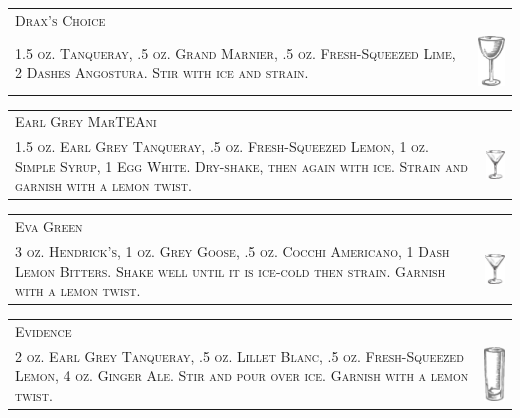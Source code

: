\documentclass{article}
\begin{document}
\begin{tabular}{b{2.5in} m{0.625in}}
  \multicolumn{2}{p{3.5in}}{\centering\Huge\textsc{Drax's Choice}} \\ 
  \textsc{1.5 oz. Tanqueray, .5 oz. Grand Marnier, .5 oz. Fresh-Squeezed Lime,
  2 Dashes Angostura. Stir with ice and strain.} &
  \includegraphics[width=0.5in]{nick_and_nora.png}
\end{tabular}

\begin{tabular}{b{2.5in} m{0.625in}}
  \multicolumn{2}{p{3.5in}}{\centering\Huge\textsc{Earl Grey MarTEAni}} \\ 
  \textsc{1.5 oz. Earl Grey Tanqueray, .5 oz. Fresh-Squeezed Lemon, 
  1 oz. Simple Syrup, 1 Egg White. Dry-shake, then again with ice.
  Strain and garnish with a lemon twist.} &
  \includegraphics[width=0.5in]{goblet.png}
\end{tabular}

\begin{tabular}{b{2.5in} m{0.625in}}
  \multicolumn{2}{p{3.5in}}{\centering\Huge\textsc{Eva Green}} \\ 
  \textsc{3 oz. Hendrick's, 1 oz. Grey Goose, .5 oz. Cocchi Americano, 
  1 Dash Lemon Bitters. Shake well until it is ice-cold then strain.
  Garnish with a lemon twist.} &
  \includegraphics[width=0.5in]{goblet.png}
\end{tabular}

\begin{tabular}{b{2.5in} m{0.625in}}
  \multicolumn{2}{p{3.5in}}{\centering\Huge\textsc{Evidence}} \\ 
  \textsc{2 oz. Earl Grey Tanqueray, .5 oz. Lillet Blanc, .5 oz. 
  Fresh-Squeezed Lemon, 4 oz. Ginger Ale. Stir and pour over ice.
  Garnish with a lemon twist.} &
  \includegraphics[width=0.5in]{collins.png}
\end{tabular}
\end{document}
